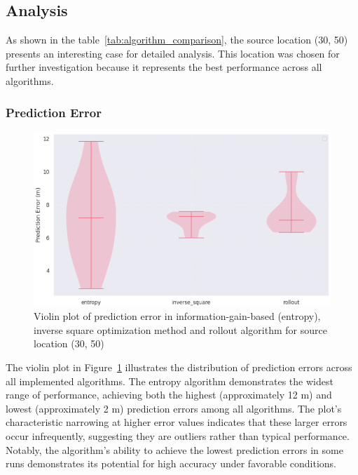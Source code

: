 \documentclass[../report.tex]{subfiles}
\begin{document}
    \subsection{Analysis}

    As shown in the table~\ref{tab:algorithm_comparison}, the source location (30, 50) presents an interesting case for detailed analysis. This location was chosen for further 
    investigation because it represents the best performance across all algorithms. 
    
    
    
    \subsubsection{Prediction Error}
    \begin{figure}[ht]
        \centering
        \includegraphics[width=\linewidth]{figures/prediction_violin_plot.png}
        \caption{Violin plot of prediction error in information-gain-based (entropy), inverse square optimization method and rollout algorithm for source location (30, 50)}
        \label{fig:prediction_violin_plot}
    \end{figure}

    The violin plot in Figure~\ref{fig:prediction_violin_plot} illustrates the distribution of prediction errors across all implemented algorithms. The entropy algorithm demonstrates the widest 
    range of performance, achieving both the highest (approximately 12 m) and lowest (approximately 2 m) prediction errors among all algorithms. The plot's characteristic narrowing at higher 
    error values indicates that these larger errors occur infrequently, suggesting they are outliers rather than typical performance. Notably, the algorithm's ability to achieve the lowest 
    prediction errors in some runs demonstrates its potential for high accuracy under favorable conditions.
\end{document}
